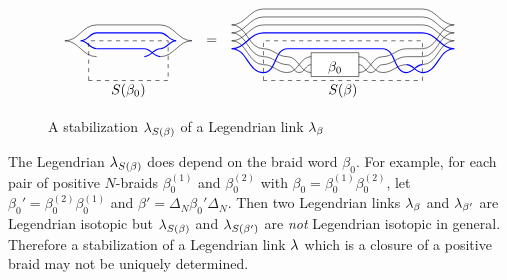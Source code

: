 \begin{figure}[ht]
\[\begin{array}{rcccc}
\begin{tikzpicture}[baseline=-.5ex,scale=0.8]
%
\draw (-2,0) to[out=0,in=180] (-1,0.5) -- (1,0.5) to[out=0,in=180] (2,0);
\draw (-2,0) to[out=0,in=180] (-1,-0.5) (1,-0.5) to[out=0,in=180] (2,0);
%
\draw[thick,blue] (-1.5,0) to[out=0,in=180] (-1,0.25) -- (1,0.25) to[out=0,in=180] (1.5,0);
\draw[thick,blue] (-1.5,0) to[out=0,in=180] (-1,-0.25) (1,-0.25) to[out=0,in=180] (1.5,0);
\draw[thick,blue] (-1,-0.25) -- (0.5,-0.25) to[out=0,in=180] (1,-0.5) (0.5,-0.5) to[out=0,in=180] (1,-0.25);
%
\draw[dashed] (-1.25,-1.25) rectangle node[below=3ex] {$S(\beta_0)$} (1.25, 0);
\end{tikzpicture}
&=&
\begin{tikzpicture}[baseline=-.5ex,scale=0.8]
%
\draw[fill=white] (-1,-1.125) rectangle node[yshift=-.5ex] {$\beta_0$} (0.5,-0.375);
%
\draw (-3.5,0.5) to[out=0,in=180] (-2.5, 1) -- (2.5,1) to[out=0,in=180] (3.5,0.5);
\draw (-3.5,0.5) to[out=0,in=180] (-2.5,-0.25) to[out=0,in=180] (-1.75, -0.5) to[out=0,in=180] (-1,-1)
(0.5,-1) to[out=0,in=180] (1.25,-0.5) to[out=0,in=180] (2,-0.25) to[out=0,in=180] (2.5,-0.25) to[out=0,in=180] (3.5,0.5);
%
\draw (-3.5,0.25) to[out=0,in=180] (-2.5, 0.75) -- (2.5,0.75) to[out=0,in=180] (3.5,0.25);
\draw (-3.5,0.25) to[out=0,in=180] (-2.5,-0.5) to[out=0,in=180] (-1.75,-0.75) to[out=0,in=180] (-1.375, -1) to[out=0,in=180] (-1, -0.75)
(0.5,-0.75) to[out=0,in=180] (0.875, -1) to[out=0,in=180] (1.25, -0.75) to[out=0,in=180] (2,-0.5) -- (2.5,-0.5) to[out=0,in=180] (3.5,0.25);
%
\draw (-3.5,0) to[out=0,in=180] (-2.5, 0.5) -- (2.5,0.5) to[out=0,in=180] (3.5,0);
\draw (-3.5,0) to[out=0,in=180] (-2.5,-0.75) to[out=0,in=180] (-1.75,-1) to[out=0,in=180] (-1,-0.5)
(0.5, -0.5) to[out=0,in=180] (1.25, -1) to[out=0,in=180] (2,-0.75) (2.5,-0.75) to[out=0,in=180] (3.5,0);
%
\draw[thick,blue] (-3.5,-0.25) to[out=0,in=180] (-2.5, 0.25) -- (2.5,0.25) to[out=0,in=180] (3.5,-0.25);
\draw[thick,blue] (-3.5,-0.25) to[out=0,in=180] (-2.5, -1) to[out=0,in=180] (-1.75, -0.25) -- (1.25, -0.25) to[out=0,in=180] (2,-1) to[out=0,in=180] (2.5,-0.75) (2,-0.75) to[out=0,in=180] (2.5,-1) to[out=0,in=180] (3.5,-0.25);
%
\draw[dashed] (-2.5,-1.25) rectangle node[below=3ex] {$S(\beta)$} (2.5,0);
\end{tikzpicture}
\end{array}
\]
\caption{A stabilization $\lambda_{S(\beta)}$ of a Legendrian link $\lambda_\beta$}
\label{figure:stabilization of Legendrian}
\end{figure}

The Legendrian $\lambda_{S(\beta)}$ does depend on the braid word $\beta_0$.
For example, for each pair of positive $N$-braids $\beta_0^{(1)}$ and $\beta_0^{(2)}$ with $\beta_0=\beta_0^{(1)}\beta_0^{(2)}$, let $\beta_0'=\beta_0^{(2)}\beta_0^{(1)}$ and $\beta' = \Delta_N\beta_0'\Delta_N$.
Then two Legendrian links $\lambda_\beta$ and $\lambda_{\beta'}$ are Legendrian isotopic but $\lambda_{S(\beta)}$ and $\lambda_{S(\beta')}$ are \emph{not} Legendrian isotopic in general.
Therefore a stabilization of a Legendrian link $\lambda$ which is a closure of a positive braid may not be uniquely determined.

